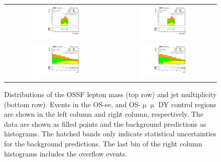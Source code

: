  \begin{figure}[tbh!]
 \begin{center}
 \begin{tabular}{cc}
 \includegraphics[width=0.48\textwidth]{figures/Part4/Evt/llM_OnZ_ee}&
 \includegraphics[width=0.48\textwidth]{figures/Part4/Evt/llM_OnZ_mumu}\\
 \includegraphics[width=0.48\textwidth]{figures/Part4/Evt/njet_OnZ_ee}&
 \includegraphics[width=0.48\textwidth]{figures/Part4/Evt/njet_OnZ_mumu}\\
 \end{tabular}
 \caption{Distributions of the \ac{OSSF} lepton mass (top row) and jet multiplicity (bottom row). Events in the \ac{OS}-ee, and \ac{OS}-$\upmu\upmu$ \ac{DY} control regions are shown in the left column and right column, respectively. The data are shown as filled points and the background predictions as histograms. The hatched bands only indicate statistical uncertainties for the background predictions. The last bin of the right column histograms includes the overflow events.}
 \label{fig:DY_CR}
 \end{center}
 \end{figure}